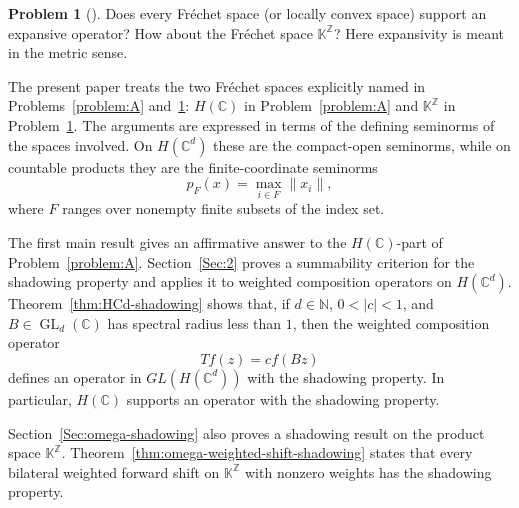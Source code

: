 \documentclass[11pt]{amsart}
\theoremstyle{definition}
\newtheorem{problem}{Problem}
\theoremstyle{remark}
\theoremstyle{plain}
\begin{document}
\begin{problem}[{\cite[Problem B]{BCDFP}}]\label{problem:B}
Does every Fr\'echet space (or locally convex space) support an expansive
operator?  How about the Fr\'echet space \(\mathbb{K}^{\mathbb{Z}}\)?
Here expansivity is
meant in the metric sense.
\end{problem}

The present paper treats the two Fr\'echet spaces explicitly named in
Problems~\ref{problem:A} and~\ref{problem:B}: \(H(\mathbb C)\) in
Problem~\ref{problem:A} and \(\mathbb K^{\mathbb Z}\) in
Problem~\ref{problem:B}.  The arguments are expressed in terms of the defining
seminorms of the spaces involved.  On \(H(\mathbb{C}^d)\) these are the
compact-open seminorms, while on countable products they are the
finite-coordinate seminorms
\[
p_F(x)=\max_{i\in F}\|x_i\|,
\]
where \(F\) ranges over nonempty finite subsets of the index set.

The first main result gives an affirmative answer to the \(H(\mathbb C)\)-part
of Problem~\ref{problem:A}.  Section~\ref{Sec:2} proves a summability criterion
for the shadowing property and applies it to weighted composition operators on
\(H(\mathbb{C}^d)\).  Theorem~\ref{thm:HCd-shadowing} shows that, if
\(d\in\mathbb{N}\), \(0<|c|<1\), and \(B\in \operatorname{GL}_d(\mathbb{C})\)
has spectral radius less than \(1\), then
the weighted composition operator
\[
Tf(z)=c f(Bz)
\]
defines an operator in \(GL(H(\mathbb{C}^d))\) with the shadowing property.  In
particular, \(H(\mathbb C)\) supports an operator with the shadowing property.

Section~\ref{Sec:omega-shadowing} also proves a shadowing result on the
product space \(\mathbb{K}^{\mathbb{Z}}\).
Theorem~\ref{thm:omega-weighted-shift-shadowing} states that every bilateral
weighted forward shift on \(\mathbb{K}^{\mathbb{Z}}\) with nonzero weights has
the shadowing property.
\end{document}
